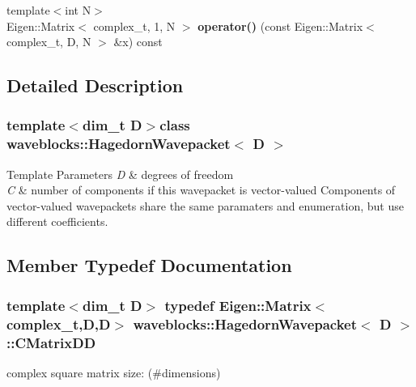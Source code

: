 \begin{DoxyCompactItemize}
\item 
\hypertarget{classwaveblocks_1_1_hagedorn_wavepacket_a7098a761ad50821b151720995001a1eb}{}{\footnotesize template$<$int N$>$ }\\Eigen\+::\+Matrix$<$ complex\+\_\+t, 1, N $>$ {\bfseries operator()} (const Eigen\+::\+Matrix$<$ complex\+\_\+t, D, N $>$ \&x) const \label{classwaveblocks_1_1_hagedorn_wavepacket_a7098a761ad50821b151720995001a1eb}

\end{DoxyCompactItemize}


\subsection{Detailed Description}
\subsubsection*{template$<$dim\+\_\+t D$>$class waveblocks\+::\+Hagedorn\+Wavepacket$<$ D $>$}


\begin{DoxyTemplParams}{Template Parameters}
{\em D} & degrees of freedom \\
\hline
{\em C} & number of components if this wavepacket is vector-\/valued Components of vector-\/valued wavepackets share the same paramaters and enumeration, but use different coefficients. \\
\hline
\end{DoxyTemplParams}


\subsection{Member Typedef Documentation}
\hypertarget{classwaveblocks_1_1_hagedorn_wavepacket_af285e57872af93378e2fd77c5ab7f528}{}
\subsubsection[{C\+Matrix\+D\+D}]{\setlength{\rightskip}{0pt plus 5cm}template$<$dim\+\_\+t D$>$ typedef Eigen\+::\+Matrix$<$complex\+\_\+t,D,D$>$ {\bf waveblocks\+::\+Hagedorn\+Wavepacket}$<$ D $>$\+::{\bf C\+Matrix\+D\+D}}\label{classwaveblocks_1_1_hagedorn_wavepacket_af285e57872af93378e2fd77c5ab7f528}
complex square matrix size\+: (\#dimensions) 

